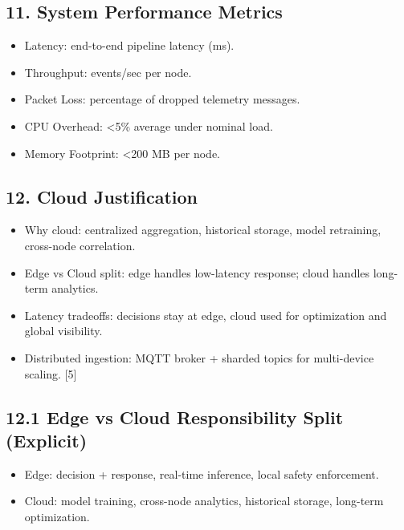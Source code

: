 \documentclass[11pt]{article}
\begin{document}
\subsection{11. System Performance Metrics}
\begin{itemize}
    \item Latency: end-to-end pipeline latency (ms).
    \item Throughput: events/sec per node.
    \item Packet Loss: percentage of dropped telemetry messages.
    \item CPU Overhead: <5\% average under nominal load.
    \item Memory Footprint: <200 MB per node.
\end{itemize}

\subsection{12. Cloud Justification}
\begin{itemize}
    \item Why cloud: centralized aggregation, historical storage, model retraining, cross-node correlation.
    \item Edge vs Cloud split: edge handles low-latency response; cloud handles long-term analytics.
    \item Latency tradeoffs: decisions stay at edge, cloud used for optimization and global visibility.
    \item Distributed ingestion: MQTT broker + sharded topics for multi-device scaling. [5]
\end{itemize}

\subsection{12.1 Edge vs Cloud Responsibility Split (Explicit)}
\begin{itemize}
    \item Edge: decision + response, real-time inference, local safety enforcement.
    \item Cloud: model training, cross-node analytics, historical storage, long-term optimization.
\end{itemize}
\end{document}

